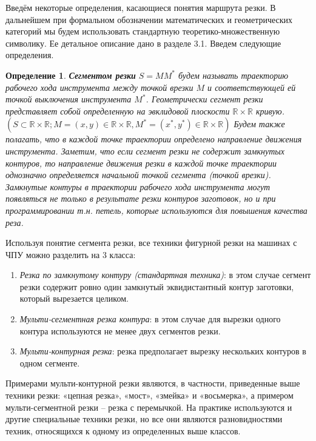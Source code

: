 \documentclass[12pt]{report}
\newcounter{theo}
\newcounter{pred}
\newcounter{opred}
\newtheorem{opred}{Определение}[section]
\begin{document}
Введём некоторые определения,
касающиеся понятия маршрута резки.
В дальнейшем при формальном обозначении
математических и геометрических категорий
мы будем использовать стандартную
теоретико-множественную символику.
Ее детальное описание дано в разделе 3.1.
Введем следующие определения.

\begin{opred}
\label{Opred1}
{\bf Сегментом резки}
$S=MM^*$
будем называть траекторию рабочего хода
инструмента между точкой врезки
$M$
и соответствующей ей точкой выключения инструмента
$M^*$.
Геометрически сегмент резки представляет собой
определенную на эвклидовой плоскости
$\mathbb R \times \mathbb R$
кривую.
$(S \subset \mathbb R \times \mathbb R;
M=(x,y) \in \mathbb R \times \mathbb R,
M^* =(x^*,y^*)\in \mathbb R \times \mathbb R)$
Будем также полагать,
что в каждой точке траектории определено направление движения инструмента.
Заметим, что если сегмент резки не содержит замкнутых контуров,
то направление движения резки в каждой точке траектории
однозначно определяется начальной точкой сегмента
(точкой врезки).
Замкнутые контуры в траектории рабочего хода инструмента
могут появляться не только в результате резки контуров заготовок,
но и при программировании т.н. петель,
которые используются для повышения качества реза.
\end{opred}

Используя понятие сегмента резки,
все техники фигурной резки на машинах с ЧПУ
можно разделить на 3 класса:
\begin{enumerate}
  \item
  {\it Резка по замкнутому контуру (стандартная техника)}:
  в этом случае сегмент резки содержит
  ровно один замкнутый эквидистантный контур заготовки,
  который вырезается целиком.
  \item
  {\it Мульти-сегментная резка контура}:
  в этом случае для вырезки одного контура
  используются не менее двух сегментов резки.
  \item
  {\it Мульти-контурная резка}:
  резка предполагает вырезку нескольких
  контуров в одном сегменте.
\end{enumerate}

Примерами мульти-контурной резки являются,
в частности, приведенные выше техники резки:
«цепная резка», «мост», «змейка» и «восьмерка»,
а примером мульти-сегментной резки –
резка с перемычкой.
На практике используются и другие специальные техники резки,
но все они являются разновидностями техник,
относящихся к одному из определенных выше классов.
\end{document}
